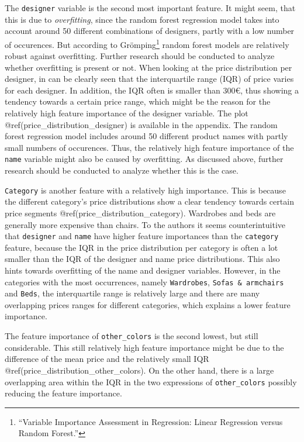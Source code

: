 \documentclass[a4paper, nobind]{templates/ociamthesis}
\begin{document}
The \texttt{designer} variable is the second most important feature. It might seem, that this is due to \emph{overfitting}, since the random forest regression model takes into account around 50 different combinations of designers, partly with a low number of occurences. But according to Grömping\footnote{``Variable Importance Assessment in Regression: Linear Regression versus Random Forest.''} random forest models are relatively robust against overfitting. Further research should be conducted to analyze whether overfitting is present or not.
When looking at the price distribution per designer, in can be clearly seen that the interquartile range (IQR) of price varies for each designer. In addition, the IQR often is smaller than 300€, thus showing a tendency towards a certain price range, which might be the reason for the relatively high feature importance of the designer variable. The plot @ref(price\_distribution\_designer) is available in the appendix.
The random forest regression model includes around 50 different product names with partly small numbers of occurences. Thus, the relatively high feature importance of the \texttt{name} variable might also be caused by overfitting. As discussed above, further research should be conducted to analyze whether this is the case.

\texttt{Category} is another feature with a relatively high importance. This is because the different category's price distributions show a clear tendency towards certain price segments @ref(price\_distribution\_category). Wardrobes and beds are generally more expensive than chairs.
To the authors it seems counterintuitive that \texttt{designer} and \texttt{name} have higher feature importances than the \texttt{category} feature, because the IQR in the price distribution per category is often a lot smaller than the IQR of the designer and name price distributions. This also hints towards overfitting of the name and designer variables. However, in the categories with the most occurrences, namely \texttt{Wardrobes}, \texttt{Sofas\ \&\ armchairs} and \texttt{Beds}, the interquartile range is relatively large and there are many overlapping prices ranges for different categories, which explains a lower feature importance.

The feature importance of \texttt{other\_colors} is the second lowest, but still considerable. This still relatively high feature importance might be due to the difference of the mean price and the relatively small IQR @ref(price\_distribution\_other\_colors). On the other hand, there is a large overlapping area within the IQR in the two expressions of \texttt{other\_colors} possibly reducing the feature importance.
\end{document}
